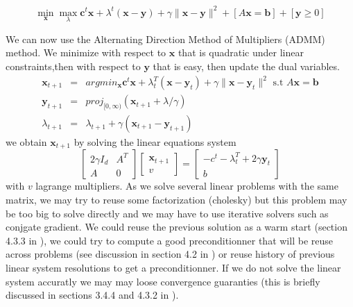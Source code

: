 \documentclass[11pt]{article}
\begin{document}
\begin{equation}
\mathop{min}_\mathbf{x} \mathop{max}_{\lambda} \mathbf{c}^t\mathbf{x} +\lambda^t (\mathbf{x}-\mathbf{y})+\gamma\|\mathbf{x}-\mathbf{y}\|^2 + [A\mathbf{x}=\mathbf{b}]+[\mathbf{y}\geq 0]
\end{equation}

We can now use the Alternating Direction Method of Multipliers (ADMM) method.
We minimize with respect to $\mathbf{x}$ that is quadratic under linear constraints,then with respect to $\mathbf{y}$ that is easy, then update the dual variables.
\begin{eqnarray}
\mathbf{x}_{t+1}&=&argmin_\mathbf{x} \mathbf{c}^t\mathbf{x} +\lambda_t^T (\mathbf{x}-\mathbf{y}_t)+\gamma\|\mathbf{x}-\mathbf{y}_t\|^2 \text{ s.t } A\mathbf{x}=\mathbf{b}\\
\mathbf{y}_{t+1}&=&proj_{[0,\infty)} (\mathbf{x}_{t+1}+\lambda/\gamma)\\
\lambda_{t+1}&=&\lambda_{t+1}+\gamma(\mathbf{x}_{t+1}-\mathbf{y}_{t+1})
\end{eqnarray}
we obtain $\mathbf{x}_{t+1}$ by solving the linear equations system
\begin{equation}
\left[\begin{array}{cc}2\gamma I_d& A^T\\A&0 \end{array}\right]\left[\begin{array}{c}\mathbf{x}_{t+1} \\ v\end{array}\right]=\left[\begin{array}{c}-c^t-\lambda_t^T +2\gamma \mathbf{y}_t \\ b\end{array}\right]
\end{equation}
with $v$ lagrange multipliers.
As we solve several linear problems with the same matrix, we may try to reuse some factorization (cholesky) but this problem may be too big to solve directly and we may have to use iterative solvers such as conjgate gradient.
We could reuse the previous solution as a warm start (section 4.3.3 in  \cite{Boyd2010}),  we could try to compute a good preconditionner that will be reuse across problems (see discussion in section 4.2 in \cite{Boyd2010}) or reuse history of previous linear system resolutions to get a preconditionner. If we do not solve the linear system accuratly we may may loose convergence guaranties (this is briefly discussed in sections 3.4.4 and 4.3.2 in  \cite{Boyd2010}).
\end{document}

